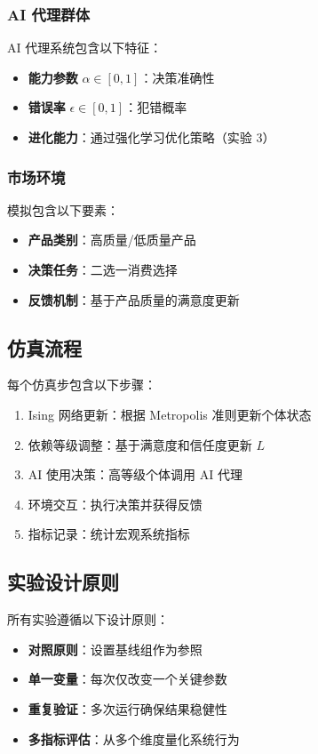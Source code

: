 \documentclass[a4paper,12pt]{article}
\begin{document}
\subsubsection{AI 代理群体}

AI 代理系统包含以下特征：
\begin{itemize}
    \item \textbf{能力参数} $\alpha \in [0,1]$：决策准确性
    \item \textbf{错误率} $\epsilon \in [0,1]$：犯错概率
    \item \textbf{进化能力}：通过强化学习优化策略（实验 3）
\end{itemize}

\subsubsection{市场环境}

模拟包含以下要素：
\begin{itemize}
    \item \textbf{产品类别}：高质量/低质量产品
    \item \textbf{决策任务}：二选一消费选择
    \item \textbf{反馈机制}：基于产品质量的满意度更新
\end{itemize}

\subsection{仿真流程}

每个仿真步包含以下步骤：
\begin{enumerate}
    \item Ising 网络更新：根据 Metropolis 准则更新个体状态
    \item 依赖等级调整：基于满意度和信任度更新 $L$
    \item AI 使用决策：高等级个体调用 AI 代理
    \item 环境交互：执行决策并获得反馈
    \item 指标记录：统计宏观系统指标
\end{enumerate}

\subsection{实验设计原则}

所有实验遵循以下设计原则：
\begin{itemize}
    \item \textbf{对照原则}：设置基线组作为参照
    \item \textbf{单一变量}：每次仅改变一个关键参数
    \item \textbf{重复验证}：多次运行确保结果稳健性
    \item \textbf{多指标评估}：从多个维度量化系统行为
\end{itemize}
\end{document}
